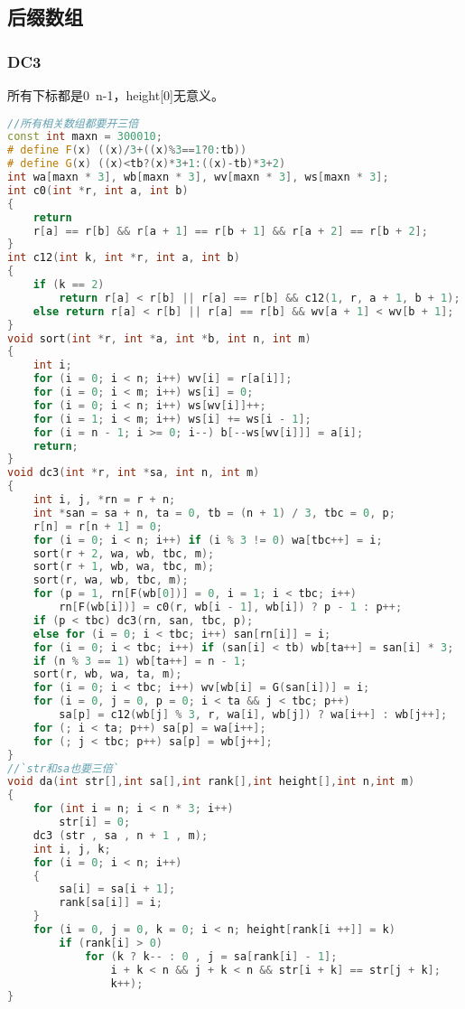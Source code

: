 \subsection{后缀数组}
	\subsubsection{DC3}
		所有下标都是0~n-1，height[0]无意义。
		\begin{lstlisting}[language=c++]
//所有相关数组都要开三倍
const int maxn = 300010;
# define F(x) ((x)/3+((x)%3==1?0:tb))
# define G(x) ((x)<tb?(x)*3+1:((x)-tb)*3+2)
int wa[maxn * 3], wb[maxn * 3], wv[maxn * 3], ws[maxn * 3];
int c0(int *r, int a, int b)
{
	return 
	r[a] == r[b] && r[a + 1] == r[b + 1] && r[a + 2] == r[b + 2];
}
int c12(int k, int *r, int a, int b)
{
	if (k == 2) 
		return r[a] < r[b] || r[a] == r[b] && c12(1, r, a + 1, b + 1);
	else return r[a] < r[b] || r[a] == r[b] && wv[a + 1] < wv[b + 1];
}
void sort(int *r, int *a, int *b, int n, int m)
{
	int i;
	for (i = 0; i < n; i++) wv[i] = r[a[i]];
	for (i = 0; i < m; i++) ws[i] = 0;
	for (i = 0; i < n; i++) ws[wv[i]]++;
	for (i = 1; i < m; i++) ws[i] += ws[i - 1];
	for (i = n - 1; i >= 0; i--) b[--ws[wv[i]]] = a[i];
	return;
}
void dc3(int *r, int *sa, int n, int m)
{
	int i, j, *rn = r + n;
	int *san = sa + n, ta = 0, tb = (n + 1) / 3, tbc = 0, p;
	r[n] = r[n + 1] = 0;
	for (i = 0; i < n; i++) if (i % 3 != 0) wa[tbc++] = i;
	sort(r + 2, wa, wb, tbc, m);
	sort(r + 1, wb, wa, tbc, m);
	sort(r, wa, wb, tbc, m);
	for (p = 1, rn[F(wb[0])] = 0, i = 1; i < tbc; i++)
		rn[F(wb[i])] = c0(r, wb[i - 1], wb[i]) ? p - 1 : p++;
	if (p < tbc) dc3(rn, san, tbc, p);
	else for (i = 0; i < tbc; i++) san[rn[i]] = i;
	for (i = 0; i < tbc; i++) if (san[i] < tb) wb[ta++] = san[i] * 3;
	if (n % 3 == 1) wb[ta++] = n - 1;
	sort(r, wb, wa, ta, m);
	for (i = 0; i < tbc; i++) wv[wb[i] = G(san[i])] = i;
	for (i = 0, j = 0, p = 0; i < ta && j < tbc; p++)
		sa[p] = c12(wb[j] % 3, r, wa[i], wb[j]) ? wa[i++] : wb[j++];
	for (; i < ta; p++) sa[p] = wa[i++];
	for (; j < tbc; p++) sa[p] = wb[j++];
}
//`str和sa也要三倍`
void da(int str[],int sa[],int rank[],int height[],int n,int m)
{
	for (int i = n; i < n * 3; i++)
		str[i] = 0;
	dc3 (str , sa , n + 1 , m);
	int i, j, k;
	for (i = 0; i < n; i++)
	{
		sa[i] = sa[i + 1];
		rank[sa[i]] = i;
	}
	for (i = 0, j = 0, k = 0; i < n; height[rank[i ++]] = k)
		if (rank[i] > 0)
			for (k ? k-- : 0 , j = sa[rank[i] - 1]; 
				i + k < n && j + k < n && str[i + k] == str[j + k];
				k++);
}
		\end{lstlisting}
		
